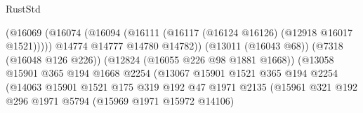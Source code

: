 \begin{lexlean}{RustStd}
\begin{coremodule}
                                                  (@16069
                                                    (@16074
                                                      (@16094
                                                        (@16111
                                                          (@16117
                                                            (@16124 @16126)
                                                            (@12918 @16017 @1521)))))
                                                    @14774
                                                    @14777
                                                    @14780
                                                    @14782))
                                                (@13011 (@16043 @68))
                                                (@7318 (@16048 @126 @226))
                                                (@12824 (@16055 @226 @98 @1881 @1668))
                                                (@13058
                                                  @15901
                                                  @365
                                                  @194
                                                  @1668
                                                  @2254
                                                  (@13067
                                                    @15901
                                                    @1521
                                                    @365
                                                    @194
                                                    @2254
                                                    (@14063
                                                      @15901
                                                      @1521
                                                      @175
                                                      @319
                                                      @192
                                                      @47
                                                      @1971
                                                      @2135
                                                      (@15961
                                                        @321
                                                        @192
                                                        @296
                                                        @1971
                                                        @5794
                                                        (@15969 @1971 @15972 @14106)

\end{coremodule}
\end{lexlean}
